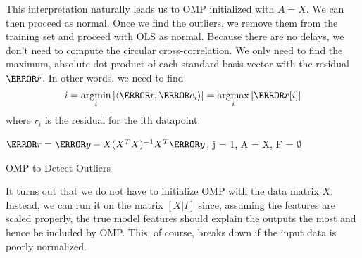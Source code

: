   This interpretation naturally leads us to OMP initialized with $A = X$. We can then proceed as normal.
  Once we find the outliers, we remove them from the training set and proceed with OLS as normal.
  Because there are no delays, we don't need to compute the circular cross-correlation. 
  We only need to find the maximum, absolute dot product of each standard basis vector with the residual $\V{r}$. In other words, we need to find
  \[
	i = \argmin_{i} |\langle \V{r}, \V{e_i} \rangle| = \argmax_{i}|\V{r}[i]|
  \]
  where $r_i$ is the residual for the ith datapoint.
  \begin{algorithm}[!h]	
	\SetAlgoLined
	$\V{r} = \V{y} - X(X^TX)^{-1}X^T\V{y}$, j = 1, A = X, F = $\emptyset$\;
	\caption{OMP to Detect Outliers}
	\label{code:omp}
  \end{algorithm}

  It turns out that we do not have to initialize OMP with the data matrix $X$.
  Instead, we can run it on the matrix $[X | I]$ since, assuming the features are scaled properly, the true model features should explain the outputs the most and hence be included by OMP.
  This, of course, breaks down if the input data is poorly normalized.

